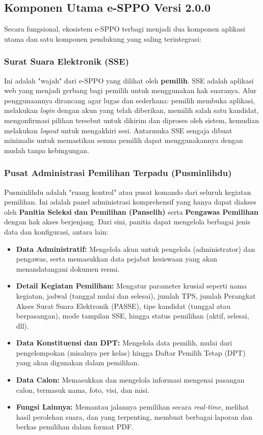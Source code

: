\subsection{Komponen Utama e-SPPO Versi 2.0.0}
Secara fungsional, ekosistem e-SPPO terbagi menjadi dua komponen aplikasi utama dan satu komponen pendukung yang saling terintegrasi:

\subsubsection{Surat Suara Elektronik (SSE)}
Ini adalah "wajah" dari e-SPPO yang dilihat oleh \textbf{pemilih}. SSE adalah aplikasi web yang menjadi gerbang bagi pemilih untuk menggunakan hak suaranya. Alur penggunaannya dirancang agar lugas dan sederhana: pemilih membuka aplikasi, melakukan \textit{login} dengan akun yang telah diberikan, memilih salah satu kandidat, mengonfirmasi pilihan tersebut untuk dikirim dan diproses oleh sistem, kemudian melakukan \textit{logout} untuk mengakhiri sesi. Antarmuka SSE sengaja dibuat minimalis untuk memastikan semua pemilih dapat menggunakannya dengan mudah tanpa kebingungan.

\subsubsection{Pusat Administrasi Pemilihan Terpadu (Pusminlihdu)}
Pusminlihdu adalah "ruang kontrol" atau pusat komando dari seluruh kegiatan pemilihan. Ini adalah panel administrasi komprehensif yang hanya dapat diakses oleh \textbf{Panitia Seleksi dan Pemilihan (Panselih)} serta \textbf{Pengawas Pemilihan} dengan hak akses berjenjang. Dari sini, panitia dapat mengelola berbagai jenis data dan konfigurasi, antara lain:
\begin{itemize}
	\item \textbf{Data Administratif:} Mengelola akun untuk pengelola (administrator) dan pengawas, serta memasukkan data pejabat kesiswaan yang akan menandatangani dokumen resmi.
	\item \textbf{Detail Kegiatan Pemilihan:} Mengatur parameter krusial seperti nama kegiatan, jadwal (tanggal mulai dan selesai), jumlah TPS, jumlah Perangkat Akses Surat Suara Elektronik (PASSE), tipe kandidat (tunggal atau berpasangan), mode tampilan SSE, hingga status pemilihan (aktif, selesai, dll).
	\item \textbf{Data Konstituensi dan DPT:} Mengelola data pemilih, mulai dari pengelompokan (misalnya per kelas) hingga Daftar Pemilih Tetap (DPT) yang akan digunakan dalam pemilihan.
	\item \textbf{Data Calon:} Memasukkan dan mengelola informasi mengenai pasangan calon, termasuk nama, foto, visi, dan misi.
	\item \textbf{Fungsi Lainnya:} Memantau jalannya pemilihan secara \textit{real-time}, melihat hasil perolehan suara, dan yang terpenting, membuat berbagai laporan dan berkas pemilihan dalam format PDF.
\end{itemize}

